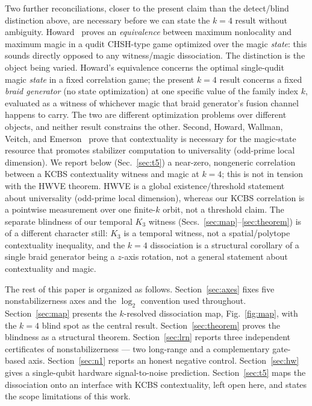\documentclass[aps,pra,twocolumn,superscriptaddress,longbibliography,floatfix,nofootinbib]{revtex4-2}
\begin{document}
Two further reconciliations, closer to the present claim than the
detect/blind distinction above, are necessary before we can state the
$k=4$ result without ambiguity. Howard~\cite{Howard2015} proves an
\emph{equivalence} between maximum nonlocality and maximum magic in a
qudit CHSH-type game optimized over the magic \emph{state}: this
sounds directly opposed to any witness/magic dissociation. The
distinction is the object being varied. Howard's equivalence concerns
the optimal single-qudit magic \emph{state} in a fixed correlation
game; the present $k=4$ result concerns a fixed \emph{braid generator}
(no state optimization) at one specific value of the family index $k$,
evaluated as a witness of whichever magic that braid generator's
fusion channel happens to carry. The two are different optimization
problems over different objects, and neither result constrains the
other. Second, Howard, Wallman, Veitch, and
Emerson~\cite{HWVE2014} prove that contextuality is necessary for the
magic-state resource that promotes stabilizer computation to
universality (odd-prime local dimension). We report below
(Sec.~\ref{sec:t5}) a near-zero, nongeneric correlation between a
KCBS contextuality witness and magic at $k=4$; this is not in tension
with the HWVE theorem. HWVE is a global existence/threshold statement
about universality (odd-prime local dimension), whereas our KCBS
correlation is a pointwise measurement over one finite-$k$ orbit, not
a threshold claim. The separate blindness of our temporal $K_3$
witness (Secs.~\ref{sec:map}--\ref{sec:theorem}) is of a different
character still: $K_3$ is a temporal witness, not a spatial/polytope
contextuality inequality, and the $k=4$ dissociation is a structural
corollary of a single braid generator being a $z$-axis rotation, not
a general statement about contextuality and magic.

The rest of this paper is organized as follows. Section~\ref{sec:axes}
fixes five nonstabilizerness axes and the $\log_2$ convention used
throughout. Section~\ref{sec:map} presents the $k$-resolved
dissociation map, Fig.~\ref{fig:map}, with the $k=4$ blind spot as the
central result. Section~\ref{sec:theorem} proves the blindness as a
structural theorem. Section~\ref{sec:lrn} reports three independent
certificates of nonstabilizerness --- two long-range and a
complementary gate-based axis. Section~\ref{sec:n1} reports
an honest negative control. Section~\ref{sec:hw} gives a
single-qubit hardware signal-to-noise prediction.
Section~\ref{sec:t5} maps the dissociation onto an interface with
KCBS contextuality, left open here,
and states the scope limitations of this work.
\end{document}
